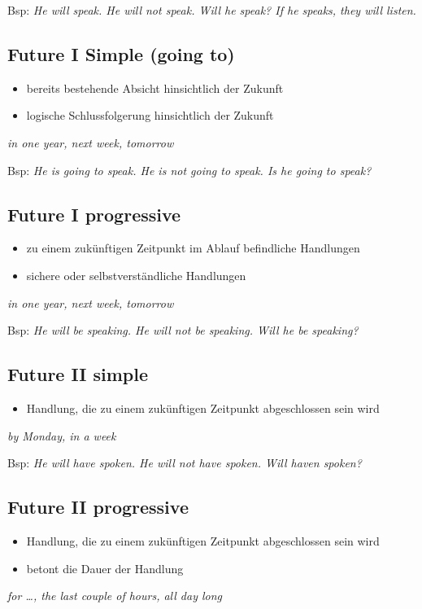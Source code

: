 Bsp: \textit{He  will speak. He will not speak. Will he speak? If he speaks, they will listen.}

\subsection{Future I Simple (going to)}
\begin{itemize}\itemsep0em
	\item bereits bestehende Absicht hinsichtlich der Zukunft
	\item logische Schlussfolgerung hinsichtlich der Zukunft
\end{itemize}
\textit{in one year, next week, tomorrow}

Bsp: \textit{He is going to speak. He is not going to speak. Is he going to speak?}

\subsection{Future I progressive}
\begin{itemize}\itemsep0em
	\item zu einem zukünftigen Zeitpunkt im Ablauf befindliche Handlungen
	\item sichere oder selbstverständliche Handlungen
\end{itemize}
\textit{in one year, next week, tomorrow}

Bsp: \textit{He will be speaking. He will not be speaking. Will he be speaking?}

\subsection{Future II simple}
\begin{itemize}\itemsep0em
	\item Handlung, die zu einem zukünftigen Zeitpunkt abgeschlossen sein wird
\end{itemize}
\textit{by Monday, in a week}

Bsp: \textit{He will have spoken. He will not have spoken. Will haven spoken?}

\subsection{Future II progressive}
\begin{itemize}\itemsep0em
	\item Handlung, die zu einem zukünftigen Zeitpunkt abgeschlossen sein wird
	\item betont die Dauer der Handlung
\end{itemize}
\textit{for \dots, the last couple of hours, all day long}

